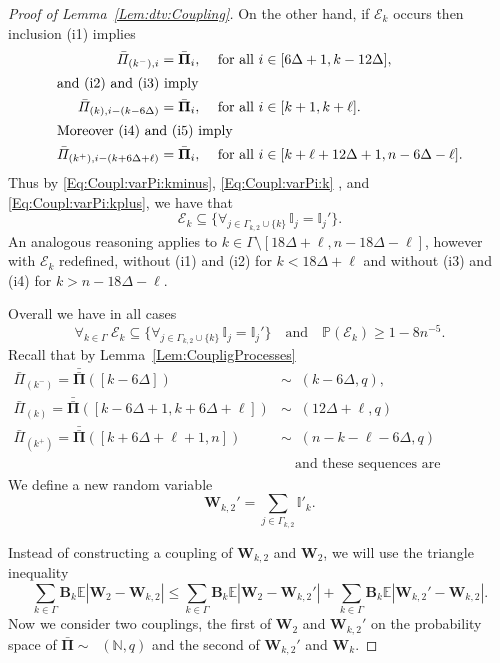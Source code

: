 \documentclass[letterpaper,11pt]{article}
\theoremstyle{definition}
\theoremstyle{remark}
\renewcommand{\le}{\leqslant}
\renewcommand{\ge}{\geqslant}
\DeclareMathOperator{\Mallows}{Mallows_{seq}}
\newcommand{\bE}{\mathbb{E}}
\newcommand{\Pra}[1]{\mathbb{P}\left(#1\right)}
\newcommand{\bB}{\mathbf{B}}
\newcommand{\Ind}{\mathbb{I}}
\newcommand{\barpi}{\bar \varPi}
\newcommand{\barPi}{\bar {\mathbf \Pi}}
\newcommand{\barbarPi}{{\bar{\bar {\mathbf \Pi}}}}
\newcommand{\NN}{\mathbb{N}}
\newcommand{\cE}{\mathcal{E}}
\newcommand{\bW}{\mathbf{W}}
\begin{document}
\begin{proof}[Proof of Lemma~\ref{Lem:dtv:Coupling}]
	On the other hand, if $\cE_k$ occurs then inclusion (i1) implies
	\begin{align}
		\label{Eq:Coupl:varPi:kminus}
		\barpi_{(k^-),i}&=\barPi_i,&&\text{ for all }i\in [6\Delta+1,k-12\Delta], \\
		\intertext{and (i2) and (i3) imply}
		\label{Eq:Coupl:varPi:k}
		\barpi_{(k),i-(k-6\Delta)}&=\barPi_{i},&&\text{ for all }i\in [k+1,k+\ell].\\ 
		\intertext{Moreover (i4) and (i5) imply}
		\label{Eq:Coupl:varPi:kplus}
		\barpi_{(k^+),i-(k+6\Delta+\ell)}&=\barPi_{i},&&\text{ for all }i\in [k+\ell+12\Delta+1,n-6\Delta-\ell]. 
	\end{align}
	Thus by \eqref{Eq:Coupl:varPi:kminus}, \eqref{Eq:Coupl:varPi:k} , and \eqref{Eq:Coupl:varPi:kplus}, we have that 
	\begin{equation}
		\cE_k \subseteq \{\forall_{j\in \Gamma_{k,2}\cup\{k\}}\, \Ind_j=\Ind_j'\}.
	\end{equation}
	An analogous reasoning applies to $k\in \Gamma\setminus [18\Delta+\ell, n-18\Delta-\ell]$, however with $\cE_k$ redefined, without (i1) and (i2) for $k<18\Delta+\ell$ and without (i3) and (i4) for $k>n-18\Delta-\ell$. 
	
	Overall we have in all cases 
	\begin{equation}\label{Eq:Ek:Ik:Ikprim}
		\forall_{k\in \Gamma}\	\cE_k \subseteq \{\forall_{j\in \Gamma_{k,2}\cup\{k\}}\, \Ind_j=\Ind_j'\}\quad\text{and}\quad \Pra{\cE_k}\ge 1-8n^{-5}.
	\end{equation}
	Recall that by Lemma~\ref{Lem:CoupligProcesses} 
	\begin{align*}
		\barpi_{(k^-)}=\barbarPi([k-6\Delta])&\sim\Mallows(k-6\Delta,q),\\
		\barpi_{(k)}=\barbarPi([k-6\Delta+1,k+6\Delta+\ell])&\sim\Mallows(12\Delta+\ell,q)\\
		\barpi_{(k^+)}=\barbarPi([k+6\Delta+\ell+1,n])&\sim\Mallows(n-k-\ell-6\Delta,q)\\
		&\quad\text{and these sequences are independent.}
	\end{align*}
	We define a new random variable
	\[
	\bW_{k,2}'=\sum_{j\in \Gamma_{k,2}}\Ind'_k.
	\]
	
	
	
	
	Instead of constructing a coupling of $\bW_{k,2}$ and $\bW_{2}$, we will use the triangle inequality \[
	\sum_{k\in \Gamma}\bB_k\bE|\bW_2-\bW_{k,2}|\le \sum_{k\in \Gamma}\bB_k\bE|\bW_2-\bW_{k,2}'| + \sum_{k\in \Gamma}\bB_k\bE|\bW_{k,2}'-\bW_{k,2}|.
	\] 
	Now we consider two couplings, the first of $\bW_{2}$ and $\bW_{k,2}'$ on the probability space of $\barPi\sim\Mallows(\NN,q)$ and the second of $\bW_{k,2}'$ and $\bW_k$. 
	

\end{proof}
\end{document}
